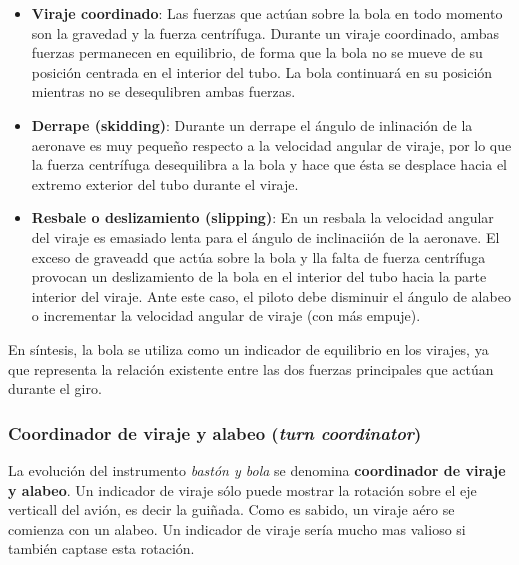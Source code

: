 \documentclass{article}
\begin{document}
\begin{itemize}
  \item \textbf{Viraje coordinado}: Las fuerzas que actúan sobre la bola en todo momento son la gravedad y la fuerza centrífuga. Durante un viraje coordinado, ambas fuerzas permanecen en equilibrio, de forma que la bola no se mueve de su posición centrada en el interior del tubo. La bola continuará en su posición mientras no se desequlibren ambas fuerzas.

  \item \textbf{Derrape (skidding)}: Durante un derrape el ángulo de inlinación de la aeronave es muy pequeño respecto a la velocidad angular de viraje, por lo que la fuerza centrífuga desequilibra a la bola y hace que ésta se desplace hacia el extremo exterior del tubo durante el viraje.
  \item \textbf{Resbale o deslizamiento (slipping)}: En un resbala la velocidad angular del viraje es emasiado lenta para el ángulo de inclinaciión de la aeronave. El exceso de graveadd que actúa sobre la bola y lla falta de fuerza centrífuga provocan un deslizamiento de la bola en el interior del tubo hacia la parte interior del viraje. Ante este caso, el piloto debe disminuir el ángulo de alabeo o incrementar la velocidad angular de viraje (con más empuje).
\end{itemize}
 En síntesis, la bola se utiliza como un indicador de equilibrio en los virajes, ya que representa la relación existente entre las dos fuerzas principales que actúan durante el giro.

 \subsubsection*{Coordinador de viraje y alabeo (\emph{turn coordinator})}

 La evolución del instrumento \emph{bastón y bola} se denomina \textbf{coordinador de viraje y alabeo}. Un indicador de viraje sólo puede mostrar la rotación sobre el eje verticall del avión, es decir la guiñada. Como es sabido, un viraje aéro se comienza con un alabeo. Un indicador de viraje sería mucho mas valioso si también captase esta rotación.
\end{document}
